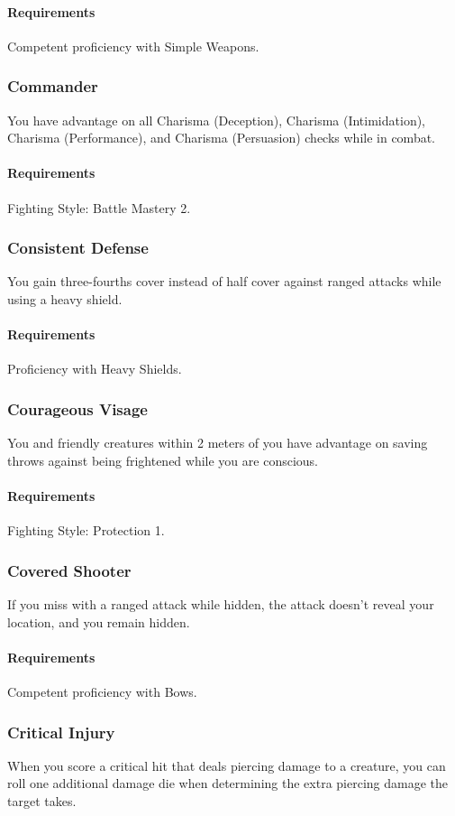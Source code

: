     \paragraph{Requirements} Competent proficiency with Simple Weapons.
\subsubsection{Commander} \label{feat::commander}
    You have advantage on all Charisma (Deception), Charisma (Intimidation), Charisma (Performance), and Charisma (Persuasion) checks while in combat.
    \paragraph{Requirements} Fighting Style: Battle Mastery 2.
\subsubsection{Consistent Defense} \label{feat::consistentefense}
    You gain three-fourths cover instead of half cover against ranged attacks while using a heavy shield.
    \paragraph{Requirements} Proficiency with Heavy Shields.
\subsubsection{Courageous Visage} \label{feat::courageousvisage}
    You and friendly creatures within 2 meters of you have advantage on saving throws against being frightened while you are conscious.
    \paragraph{Requirements} Fighting Style: Protection 1.
\subsubsection{Covered Shooter} \label{feat::coveredshooter}
    If you miss with a ranged attack while hidden, the attack doesn't reveal your location, and you remain hidden.
    \paragraph{Requirements} Competent proficiency with Bows.
\subsubsection{Critical Injury} \label{feat::criticalinjury}
    When you score a critical hit that deals piercing damage to a creature, you can roll one additional damage die when determining the extra piercing damage the target takes.
